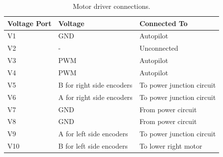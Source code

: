 \documentclass[letterpaper,12pt]{report}
\begin{document}
\begin{table}[h]
	\centering
	\begin{tabular}{| l | l | l |}
 		\hline
 		Voltage Port & Voltage & Connected To \\ \hline 
 		V1 & GND  & Autopilot \\ \hline
 		V2 & - & Unconnected \\ \hline
 		V3 & PWM & Autopilot \\ \hline
 		V4 & PWM & Autopilot \\ \hline
 		V5 & B for right side encoders & To power junction circuit \\ \hline
 		V6 & A for right side encoders & To power junction circuit \\ \hline
 		V7 & GND & From power circuit  \\ \hline
 		V8 & GND & From power circuit \\ \hline
 		V9 & A for left side encoders  & To power junction circuit\\ \hline
 		V10 & B for left side encoders & To lower right motor \\ \hline
	\end{tabular}
	\caption{Motor driver connections.}
\end{table}
\end{document}
